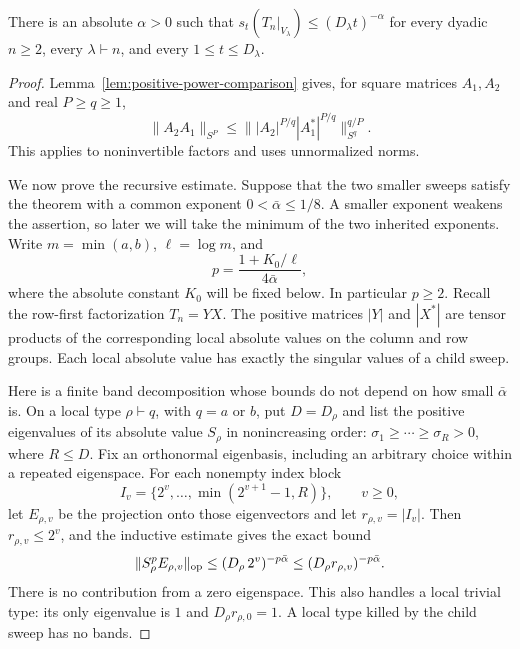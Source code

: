 \begin{theorem}\label{rec:all-rank-power}
There is an absolute $\alpha>0$ such that
$s_t(T_n|_{V_\lambda})\le(D_\lambda t)^{-\alpha}$ for every
dyadic $n\ge2$, every $\lambda\vdash n$, and every
$1\le t\le D_\lambda$.
\end{theorem}
\begin{proof}
Lemma~\ref{lem:positive-power-comparison} gives, for square
matrices $A_1,A_2$ and real $P\ge q\ge1$,
\begin{equation}\label{rec:band-power-interpolation}
 \|A_2A_1\|_{S^P}
 \le\big\||A_2|^{P/q}|A_1^*|^{P/q}\big\|_{S^q}^{q/P}.
\end{equation}
This applies to noninvertible factors and uses unnormalized norms.

We now prove the recursive estimate.  Suppose that the two smaller
sweeps satisfy the theorem with a common exponent
$0<\bar\alpha\le1/8$.  A smaller exponent weakens the assertion,
so later we will take the minimum of the two inherited exponents.
Write $m=\min(a,b)$, $\ell=\log m$, and
\[
 p=\frac{1+K_0/\ell}{4\bar\alpha},
\]
where the absolute constant $K_0$ will be fixed below.
In particular $p\ge2$.
Recall the row-first factorization $T_n=YX$.
The positive matrices $|Y|$ and $|X^*|$ are tensor products of
the corresponding local absolute values on the column and row
groups.  Each local absolute value has exactly the singular
values of a child sweep.

Here is a finite band decomposition whose bounds do not depend
on how small $\bar\alpha$ is.  On a local type
$\rho\vdash q$, with $q=a$ or $b$, put $D=D_\rho$ and list
the positive eigenvalues of its absolute value $S_\rho$ in
nonincreasing order:
$\sigma_1\ge\cdots\ge\sigma_R>0$, where $R\le D$.
Fix an orthonormal eigenbasis, including an arbitrary choice
within a repeated eigenspace.  For each nonempty index block
\[
 I_v=\{2^v,\ldots,\min(2^{v+1}-1,R)\},\qquad v\ge0,
\]
let $E_{\rho,v}$ be the projection onto those eigenvectors and
let $r_{\rho,v}=|I_v|$.  Then $r_{\rho,v}\le2^v$, and the
inductive estimate gives the exact bound
\begin{equation}\label{rec:band-local-rank-bound}
 \|S_\rho^pE_{\rho,v}\|_{\mathrm{op}}
 \le(D_\rho\,2^v)^{-p\bar\alpha}
 \le(D_\rho r_{\rho,v})^{-p\bar\alpha}.
\end{equation}
There is no contribution from a zero eigenspace.  This also
handles a local trivial type: its only eigenvalue is $1$ and
$D_\rho r_{\rho,0}=1$.  A local type killed by the child sweep
has no bands.


\end{proof}
